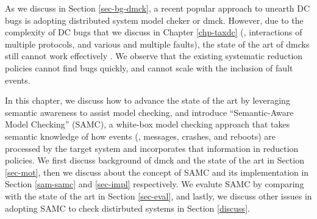 
As we discuss in Section \ref{sec-bg-dmck}, a recent popular approach to unearth
DC bugs is adopting distributed system model cheker or dmck. However, due to the
complexity of DC bugs that we discuss in Chapter \ref{chp-taxdc} (\eg,
interactions of multiple protocols, and various and multiple faults), the state
of the art of dmcks still cannot work effectively . We observe that the existing systematic reduction policies
cannot find bugs quickly, and cannot scale with the inclusion of fault events.

In this chapter, we discuss how to advance the state of the art by leveraging
semantic awareness to assist model checking, and introduce ``Semantic-Aware
Model Checking'' (SAMC), a white-box model checking approach that takes semantic
knowledge of how events (\eg, messages, crashes, and reboots) are processed by
the target system and incorporates that information in reduction policies. We
first discuss background of dmck and the state of the art in Section \ref{sec-mot},
then we discuss about the concept of SAMC and its implementation in Section
\ref{sam-samc} and \ref{sec-impl} respectively. We evalute SAMC by comparing with the
state of the art in Section \ref{sec-eval}, and lastly, we discuss other issues in
adopting SAMC to check distirbuted systems in Section \ref{discuss}.


